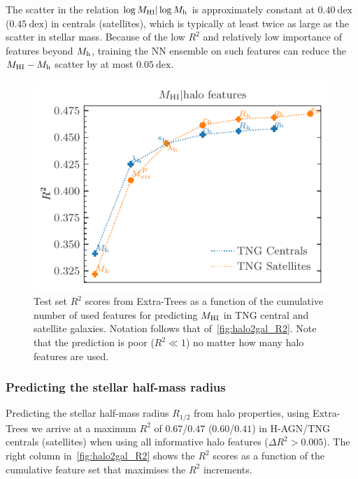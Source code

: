\documentclass[usenatbib,useAMS]{mnras}
\begin{document}
The scatter in the relation $\log M_\mathrm{HI} | \log M_{\rm h}$ is approximately constant at $0.40~\mathrm{dex}$ ($0.45~\mathrm{dex}$) in centrals (satellites), which is typically at least twice as large as the scatter in stellar mass. Because of the low $R^2$ and relatively low importance of features beyond $M_{\rm h}$, training the NN ensemble on such features can reduce the $M_{\rm HI} - M_{\rm h}$ scatter by at most $0.05~\mathrm{dex}$.

\begin{figure}
    \centering
    \includegraphics[width=\columnwidth]{Figures/galaxy_Mhi_R2.pdf}
    \caption{Test set $R^2$ scores from Extra-Trees as a function of the cumulative number of used features for predicting $M_{\rm HI}$ in TNG central and satellite galaxies. Notation follows that of~\cref{fig:halo2gal_R2}. Note that the prediction is poor ($R^2 \ll 1$) no matter how many halo features are used.}
    \label{fig:neutral_hydrogen_R2s}
\end{figure}


\subsubsection{Predicting the stellar half-mass radius}

Predicting the stellar half-mass radius $R_{1/2}$ from halo properties, using Extra-Trees we arrive at a maximum $R^2$ of $0.67$/$0.47$ ($0.60$/$0.41$) in H-AGN/TNG centrals (satellites) when using all informative halo features ($\Delta R^2 > 0.005$). The right column in~\cref{fig:halo2gal_R2} shows the $R^2$ scores as a function of the cumulative feature set that maximises the $R^2$ increments.
\end{document}
